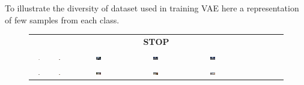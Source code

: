 To illustrate the diversity of dataset used in training VAE here a representation of few samples from each class.

\begin{figure}
    \begin{tabular}{cccccccccc}
        \multicolumn{10}{c}{\textbf{STOP}} \\
        \includegraphics[width=0.1\textwidth]{img/diversity/stop_01.png} &
        \includegraphics[width=0.1\textwidth]{img/diversity/stop_02.png} &
        \includegraphics[width=0.1\textwidth]{img/diversity/stop_03.png} &
        \includegraphics[width=0.1\textwidth]{img/diversity/stop_04.png} &
        \includegraphics[width=0.1\textwidth]{img/diversity/stop_05.png} & \\
        \includegraphics[width=0.1\textwidth]{img/diversity/stop_06.png} &
        \includegraphics[width=0.1\textwidth]{img/diversity/stop_07.png} &
        \includegraphics[width=0.1\textwidth]{img/diversity/stop_08.png} &
        \includegraphics[width=0.1\textwidth]{img/diversity/stop_09.png} &
        \includegraphics[width=0.1\textwidth]{img/diversity/stop_10.png} \\


\end{tabular}
\end{figure}
